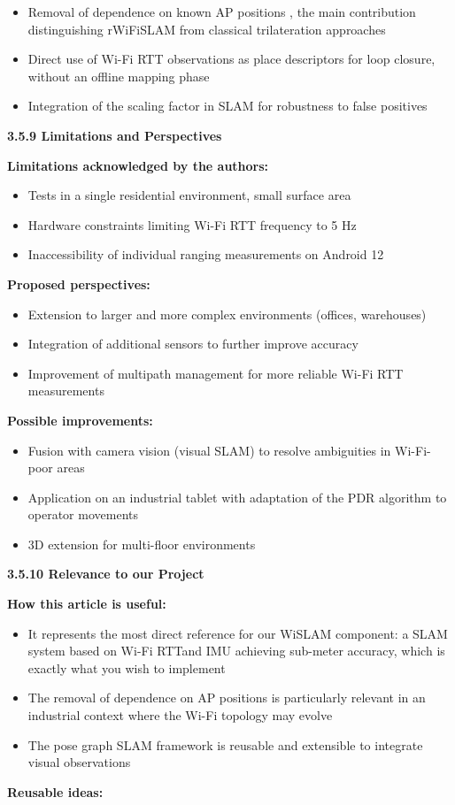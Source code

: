 \documentclass{ipgpmaster}
\begin{document}
\begin{itemize}
    \item Removal of dependence on known AP positions ,  the main contribution distinguishing rWiFiSLAM from classical trilateration approaches
    \item Direct use of Wi-Fi RTT observations as place descriptors for loop closure, without an offline mapping phase
    \item Integration of the scaling factor in SLAM for robustness to false positives


\end{itemize}
 \textbf{3.5.9 Limitations and Perspectives}

\textbf{Limitations acknowledged by the authors:}

\begin{itemize}
    \item Tests in a single residential environment, small surface area
    \item Hardware constraints limiting Wi-Fi RTT frequency to 5 Hz
    \item Inaccessibility of individual ranging measurements on Android 12
\end{itemize}
\textbf{Proposed perspectives:}

\begin{itemize}
    \item Extension to larger and more complex environments (offices, warehouses)
    \item Integration of additional sensors to further improve accuracy
    \item Improvement of multipath management for more reliable Wi-Fi RTT measurements
\end{itemize}
\textbf{Possible improvements:}

\begin{itemize}
    \item Fusion with camera vision (visual SLAM) to resolve ambiguities in Wi-Fi-poor areas
    \item Application on an industrial tablet with adaptation of the PDR algorithm to operator movements
    \item 3D extension for multi-floor environments

\end{itemize}
 \textbf{3.5.10 Relevance to our Project}

\textbf{How this article is useful:}

\begin{itemize}
    \item It represents the most direct reference for our WiSLAM component: a SLAM system based on Wi-Fi RTTand  IMU achieving sub-meter accuracy, which is exactly what you wish to implement
    \item The removal of dependence on AP positions is particularly relevant in an industrial context where the Wi-Fi topology may evolve
    \item The pose graph SLAM framework is reusable and extensible to integrate visual observations
\end{itemize}
\textbf{Reusable ideas:}
\end{document}
